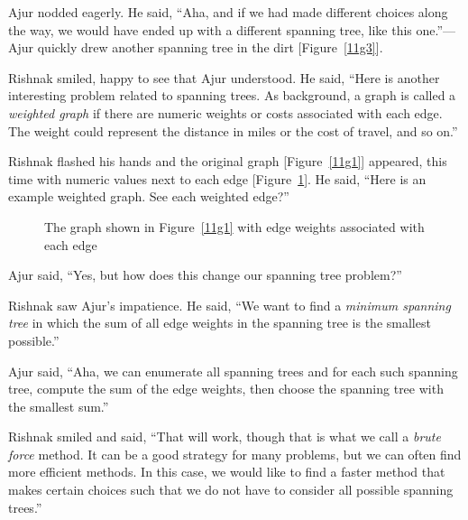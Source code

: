 Ajur nodded eagerly. He said, ``Aha, and if we had made different choices along the way, we would have ended up with a different spanning tree, like this one.''---Ajur quickly drew another spanning tree in the dirt [Figure~\ref{11g3}].

Rishnak smiled, happy to see that Ajur understood. He said, ``Here is another interesting problem related to spanning trees. As background, a graph is called a \textit{weighted graph} if there are numeric weights or costs associated with each edge. The weight could represent the distance in miles or the cost of travel, and so on.''

Rishnak flashed his hands and the original graph [Figure~\ref{11g1}] appeared, this time with numeric values next to each edge [Figure~\ref{11g7}]. He said, ``Here is an example weighted graph. See each weighted edge?''

\begin{figure}
\begin{center}
\caption{The graph shown in Figure~\ref{11g1} with edge weights associated with each edge}\label{11g7}
\end{center}
\end{figure}

Ajur said, ``Yes, but how does this change our spanning tree problem?''

Rishnak saw Ajur's impatience. He said, ``We want to find a \textit{minimum spanning tree} in which the sum of all edge weights in the spanning tree is the smallest possible.''

Ajur said, ``Aha, we can enumerate all spanning trees and for each such spanning tree, compute the sum of the edge weights, then choose the spanning tree with the smallest sum.''

Rishnak smiled and said, ``That will work, though that is what we call a \textit{brute force} method. It can be a good strategy for many problems, but we can often find more efficient methods. In this case, we would like to find a faster method that makes certain choices such that we do not have to consider all possible spanning trees.''

